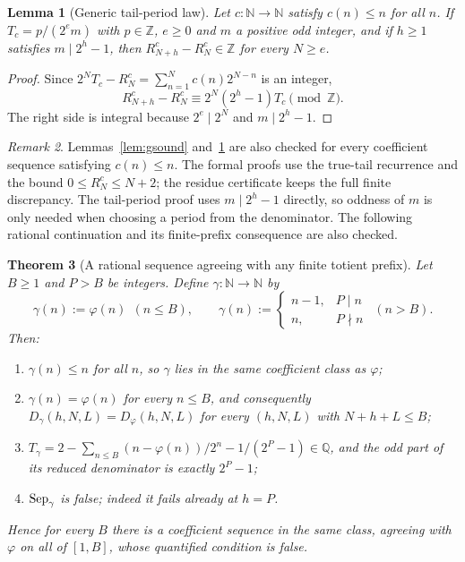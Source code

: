 \documentclass[11pt]{article}
\theoremstyle{plain}
\newtheorem{thm}{Theorem}[section]
\newtheorem{lem}[thm]{Lemma}
\theoremstyle{definition}
\theoremstyle{remark}
\newtheorem{rem}[thm]{Remark}
\let\origmathrm\mathrm
\renewcommand{\mathrm}[1]{\ifmmode\origmathrm{#1}\else\textrm{#1}\fi}%
\newcommand{\N}{\mathbb{N}}
\newcommand{\Z}{\mathbb{Z}}
\newcommand{\Q}{\mathbb{Q}}
\begin{document}
\begin{lem}[Generic tail-period law]
\label{lem:gperiod}
Let $c:\N\to\N$ satisfy $c(n)\le n$ for all $n$. If
$T_c = p/(2^{e}m)$ with $p\in\Z$, $e\ge0$ and $m$ a positive odd integer,
and if $h\ge1$ satisfies
$m\mid 2^h-1$, then
$R^{c}_{N+h} - R^{c}_{N} \in \Z$ for every $N \ge e$.
\end{lem}

\begin{proof}
Since $2^NT_c-R^c_N=\sum_{n=1}^N c(n)2^{N-n}$ is an integer,
\[
 R^c_{N+h}-R^c_N\equiv2^N(2^h-1)T_c\pmod\Z.
\]
The right side is integral because $2^e\mid2^N$ and $m\mid2^h-1$.
\end{proof}

\begin{rem}
Lemmas~\ref{lem:gsound} and~\ref{lem:gperiod} are also checked for every
coefficient sequence satisfying $c(n)\le n$. The formal proofs use the
true-tail recurrence and the bound $0\le R^c_N\le N+2$; the residue
certificate keeps the full finite discrepancy. The tail-period proof uses
$m\mid2^h-1$ directly, so oddness of $m$ is only needed when choosing a
period from the denominator. The following rational continuation and its
finite-prefix consequence are also checked.
\end{rem}

\begin{thm}[A rational sequence agreeing with any finite totient prefix]
\label{thm:gamma}
Let $B\ge1$ and $P>B$ be integers. Define $\gamma : \N \to \N$ by
\[
  \gamma(n) := \varphi(n) \ \ (n \le B), \qquad
  \gamma(n) := \begin{cases} n-1, & P \mid n \\ n, & P \nmid n \end{cases}
  \ \ (n > B).
\]
Then:
\begin{enumerate}[label=(\roman*),leftmargin=*]
\item $\gamma(n) \le n$ for all $n$, so $\gamma$ lies in the same coefficient
  class as $\varphi$;
\item $\gamma(n) = \varphi(n)$ for every $n \le B$, and consequently
  $D_\gamma(h,N,L) = D_\varphi(h,N,L)$ for every $(h,N,L)$ with
  $N + h + L \le B$;
\item $T_\gamma = 2-\sum_{n\le B}(n-\varphi(n))/2^n-1/(2^P-1)\in\Q$,
  and the odd part of its reduced denominator is \emph{exactly} $2^P-1$;
\item $\mathrm{Sep}_\gamma$ is false; indeed it fails already at $h = P$.
\end{enumerate}
Hence for every $B$ there is a coefficient sequence in the same class,
agreeing with $\varphi$ on all of $[1,B]$, whose quantified condition is false.
\end{thm}
\end{document}
